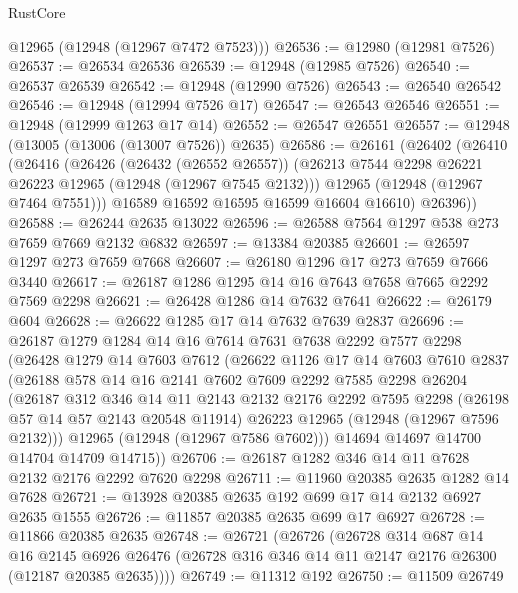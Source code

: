 \begin{lexlean}{RustCore}
\begin{coremodule}
      @12965
      (@12948 (@12967 @7472 @7523)))
@26536 := @12980 (@12981 @7526)
@26537 := @26534 @26536
@26539 := @12948 (@12985 @7526)
@26540 := @26537 @26539
@26542 := @12948 (@12990 @7526)
@26543 := @26540 @26542
@26546 := @12948 (@12994 @7526 @17)
@26547 := @26543 @26546
@26551 := @12948 (@12999 @1263 @17 @14)
@26552 := @26547 @26551
@26557 := @12948 (@13005 (@13006 (@13007 @7526)) @2635)
@26586 := @26161
    (@26402
      (@26410
        (@26416
          (@26426
            (@26432 (@26552 @26557))
            (@26213 @7544 @2298 @26221 @26223 @12965 (@12948 (@12967 @7545 @2132)))
            @12965
            (@12948 (@12967 @7464 @7551)))
          @16589
          @16592
          @16595
          @16599
          @16604
          @16610)
        @26396))
@26588 := @26244 @2635 @13022
@26596 := @26588 @7564 @1297 @538 @273 @7659 @7669 @2132 @6832
@26597 := @13384 @20385
@26601 := @26597 @1297 @273 @7659 @7668
@26607 := @26180 @1296 @17 @273 @7659 @7666 @3440
@26617 := @26187 @1286 @1295 @14 @16 @7643 @7658 @7665 @2292 @7569 @2298
@26621 := @26428 @1286 @14 @7632 @7641
@26622 := @26179 @604
@26628 := @26622 @1285 @17 @14 @7632 @7639 @2837
@26696 := @26187
    @1279
    @1284
    @14
    @16
    @7614
    @7631
    @7638
    @2292
    @7577
    @2298
    (@26428
      @1279
      @14
      @7603
      @7612
      (@26622
        @1126
        @17
        @14
        @7603
        @7610
        @2837
        (@26188
          @578
          @14
          @16
          @2141
          @7602
          @7609
          @2292
          @7585
          @2298
          @26204
          (@26187
            @312
            @346
            @14
            @11
            @2143
            @2132
            @2176
            @2292
            @7595
            @2298
            (@26198 @57 @14 @57 @2143 @20548 @11914)
            @26223
            @12965
            (@12948 (@12967 @7596 @2132)))
          @12965
          (@12948 (@12967 @7586 @7602)))
        @14694
        @14697
        @14700
        @14704
        @14709
        @14715))
@26706 := @26187 @1282 @346 @14 @11 @7628 @2132 @2176 @2292 @7620 @2298
@26711 := @11960 @20385 @2635 @1282 @14 @7628
@26721 := @13928 @20385 @2635 @192 @699 @17 @14 @2132 @6927 @2635 @1555
@26726 := @11857 @20385 @2635 @699 @17 @6927
@26728 := @11866 @20385 @2635
@26748 := @26721
    (@26726
      (@26728
        @314
        @687
        @14
        @16
        @2145
        @6926
        @26476
        (@26728 @316 @346 @14 @11 @2147 @2176 @26300 (@12187 @20385 @2635))))
@26749 := @11312 @192
@26750 := @11509 @26749

\end{coremodule}
\end{lexlean}
